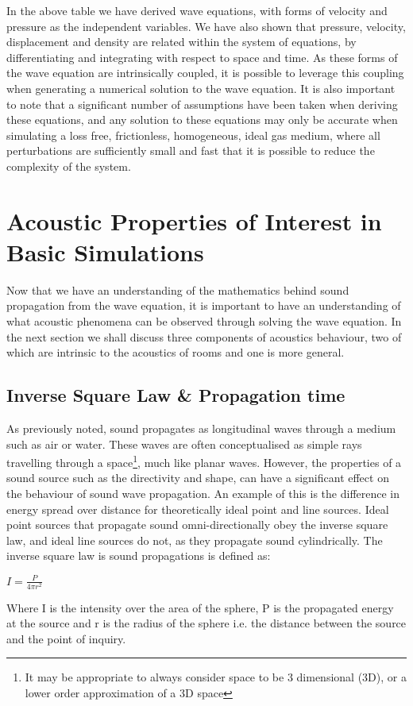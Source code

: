 In the above table we have derived wave equations, with forms of velocity and pressure as the independent variables. We have also shown that pressure, velocity, displacement and density are related within the system of equations, by differentiating and integrating with respect to space and time. As these forms of the wave equation are intrinsically coupled, it is possible to leverage this coupling when generating a numerical solution to the wave equation. It is also important to note that a significant number of assumptions have been taken when deriving these equations, and any solution to these equations may only be accurate when simulating a loss free, frictionless, homogeneous, ideal gas medium, where all perturbations are sufficiently small and fast that it is possible to reduce the complexity of the system.\\

\section{Acoustic Properties of Interest in Basic Simulations}
Now that we have an understanding of the mathematics behind sound propagation from the wave equation, it is important to have an understanding of what acoustic phenomena can be observed through solving the wave equation. In the next section we shall discuss three components of acoustics behaviour, two of which are intrinsic to the acoustics of rooms and one is more general.\\

\subsection{Inverse Square Law \& Propagation time}
As previously noted, sound propagates as longitudinal waves through a medium such as air or water. These waves are often conceptualised as simple rays travelling through a space\footnote{It may be appropriate to always consider space to be 3 dimensional (3D), or a lower order approximation of a 3D space}, much like planar waves. However, the properties of a sound source such as the directivity and shape, can have a significant effect on the behaviour of sound wave propagation. An example of this is the difference in energy spread over distance for theoretically ideal point and line sources. Ideal point sources that propagate sound omni-directionally obey the inverse square law, and ideal line sources do not, as they propagate sound cylindrically. The inverse square law is sound propagations is defined as:\\
\begin{center}
$I = \frac{P}{4 \pi r^2}$\\
\end{center}
Where I is the intensity over the area of the sphere, P is the propagated energy at the source and r is the radius of the sphere i.e. the distance between the source and the point of inquiry.\\



